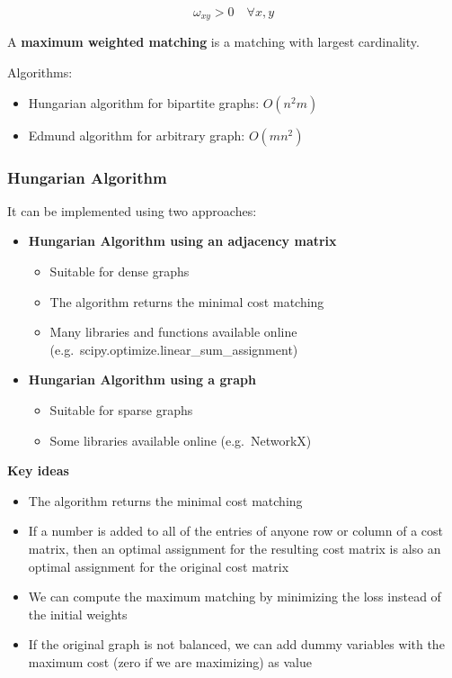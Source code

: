 \documentclass[10pt,a4paper]{article}
\begin{document}
$$ \omega_{xy} > 0 \quad \forall x,y $$

A \textbf{maximum weighted matching} is a matching with largest cardinality.


Algorithms:

\begin{itemize}
\item Hungarian algorithm for bipartite graphs: $O(n^2 m)$
\item Edmund algorithm for arbitrary graph: $O(m n^2)$
\end{itemize}

\subsubsection{Hungarian Algorithm}\label{hungarian-algorithm}

It can be implemented using two approaches:

\begin{itemize}
\item \textbf{Hungarian Algorithm using an adjacency matrix}
\begin{itemize}
\item Suitable for dense graphs
\item The algorithm returns the minimal cost matching
\item Many libraries and functions available online\\
(e.g.~scipy.optimize.linear\_sum\_assignment)
\end{itemize}
\item \textbf{Hungarian Algorithm using a graph}
\begin{itemize}
\item Suitable for sparse graphs
\item Some libraries available online (e.g.~NetworkX)
\end{itemize}
\end{itemize}

\textbf{Key ideas}

\begin{itemize}
\item The algorithm returns the minimal cost matching
\item If a number is added to all of the entries of anyone row or column of a cost matrix, then an optimal assignment for the resulting cost matrix is also an optimal assignment for the original cost matrix
\item We can compute the maximum matching by minimizing the loss instead of the initial weights
\item If the original graph is not balanced, we can add dummy variables with the maximum cost (zero if we are maximizing) as value
\end{itemize}
\end{document}

